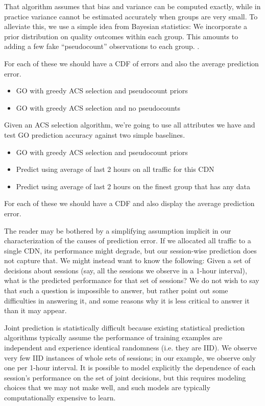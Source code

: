 That algorithm assumes that bias and variance can be computed exactly, while in practice variance cannot be estimated accurately when groups are very small.  To alleviate this, we use a simple idea from Bayesian statistics: We incorporate a prior distribution on quality outcomes within each group.  This amounts to adding a few fake ``pseudocount'' observations to each group.  \fillme.

For each of these we should have a CDF of errors and also the average prediction error.
\begin{itemize}
	\item GO with greedy ACS selection and pseudocount priors
	\item GO with greedy ACS selection and no pseudocounts
\end{itemize}

Given an ACS selection algorithm, we’re going to use all attributes we have and test GO prediction accuracy against two simple baselines.
\begin{itemize}
	\item GO with greedy ACS selection and pseudocount priors
	\item Predict using average of last 2 hours on all traffic for this CDN
	\item Predict using average of last 2 hours on the finest group that has any data
\end{itemize}
For each of these we should have a CDF and also display the average prediction error.


The reader may be bothered by a simplifying assumption implicit in our characterization of the causes of prediction error.  If we allocated all traffic to a single CDN, its performance might degrade, but our session-wise prediction does not capture that.  We might instead want to know the following: Given a set of decisions about sessions (say, all the sessions we observe in a 1-hour interval), what is the predicted performance for that set of sessions?  We do not wish to say that such a question is impossible to answer, but rather point out some difficulties in answering it, and some reasons why it is less critical to answer it than it may appear.

Joint prediction is statistically difficult because existing statistical prediction algorithms typically assume the performance of training examples are independent and experience identical randomness (i.e. they are IID).  We observe very few IID instances of whole sets of sessions; in our example, we observe only one per 1-hour interval.  It is possible to model explicitly the dependence of each session’s performance on the set of joint decisions, but this requires modeling choices that we may not make well, and such models are typically computationally expensive to learn. \fillme

